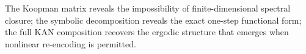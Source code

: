 \documentclass{article}
\newcommand{\R}{\mathbb{R}}
\newcommand{\x}{\bm{x}}
\begin{document}
The Koopman matrix reveals the impossibility of finite-dimensional spectral closure; the symbolic decomposition reveals the exact one-step functional form; the full KAN composition recovers the ergodic structure that emerges when nonlinear re-encoding is permitted. 







\end{document}
